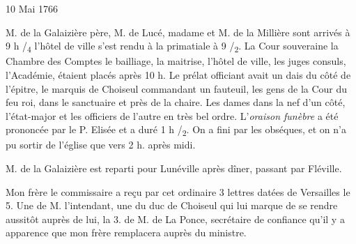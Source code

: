                      \begin{diary}{10 Mai 1766}{}


                           M. de la Galaizière père, M. de
                              Lucé, madame et
                           M. de la
                              Millière sont arrivés à 9 h /\textsubscript{4}
                           l'hôtel de ville s'est rendu à
                              la primatiale
                           à 9 /\textsubscript{2}. La Cour souveraine
                           la Chambre des Comptes
                           le bailliage,
                           la maitrise, l'hôtel de ville, les juges consuls,
                           l'Académie, étaient
                           placés après 10 h. Le
                           prélat officiant avait un dais du côté de
                           l'épitre, le marquis de Choiseul commandant un fauteuil, les
                           gens de la Cour du feu roi,
                           dans le sanctuaire
                           et près de la chaire. Les dames dans la
                           nef d'un côté, l’état-major et les officiers
                           de l'autre en très bel ordre. L'\emph{oraison
                                 funèbre}
                           a été prononcée par le P. Elisée
                           et a duré
                           1 h /\textsubscript{2}. On a fini par les
                           obséques, et on
                           n'a pu sortir de l’église que vers 2 h. après
                           midi. \bigskip



                           M. de la Galaizière est reparti pour Lunéville
                           après dîner, passant par Fléville. \bigskip



                           Mon frère le commissaire a reçu par cet
                           ordinaire 3 lettres datées de Versailles
                           le 5.
                           Une de M. l'intendant, une du
                              duc
                              de Choiseul qui lui marque de se rendre
                           aussitôt auprès de lui, la 3. de M. de La Ponce,
                           secrétaire de confiance qu'il y a apparence
                           que mon frère
                           remplacera auprès du ministre.
                        \bigskip


                     \end{diary}
